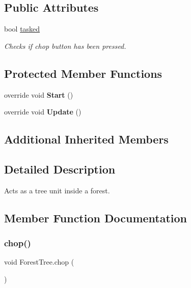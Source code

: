 \subsection*{Public Attributes}
\begin{DoxyCompactItemize}
\item 
bool \mbox{\hyperlink{class_forest_tree_a2659ff18387589b37c06e7b78d53d057}{tasked}}
\begin{DoxyCompactList}\small\item\em Checks if chop button has been pressed. \end{DoxyCompactList}\end{DoxyCompactItemize}
\subsection*{Protected Member Functions}
\begin{DoxyCompactItemize}
\item 
\mbox{\label{class_forest_tree_a0c88b45d7a27968dd89921388c483196}} 
override void {\bfseries Start} ()
\item 
\mbox{\label{class_forest_tree_a290467956d066fcabecd70dc34472aff}} 
override void {\bfseries Update} ()
\end{DoxyCompactItemize}
\subsection*{Additional Inherited Members}


\subsection{Detailed Description}
Acts as a tree unit inside a forest. 



\subsection{Member Function Documentation}
\mbox{\label{class_forest_tree_abe30600ac2bcc9d846eaffab8f946f55}} 
\subsubsection{\texorpdfstring{chop()}{chop()}}
{\footnotesize\ttfamily void Forest\+Tree.\+chop (\begin{DoxyParamCaption}{ }\end{DoxyParamCaption})}



